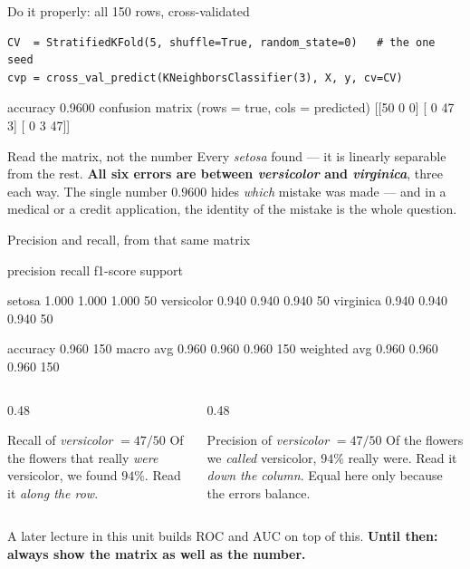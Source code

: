 \documentclass[aspectratio=169]{beamer}
\begin{document}
\begin{frame}[fragile,shrink=8]{Do it properly: all 150 rows, cross-validated}
\begin{lstlisting}
CV  = StratifiedKFold(5, shuffle=True, random_state=0)   # the one seed
cvp = cross_val_predict(KNeighborsClassifier(3), X, y, cv=CV)
\end{lstlisting}
\begin{outblk}
accuracy 0.9600
confusion matrix (rows = true, cols = predicted)
[[50  0  0]
 [ 0 47  3]
 [ 0  3 47]]
\end{outblk}
\begin{alertblock}{Read the matrix, not the number}
  \footnotesize Every \emph{setosa} found --- it is linearly separable from
  the rest. \textbf{All six errors are between \emph{versicolor} and
  \emph{virginica}}, three each way. The single number $0.9600$ hides
  \emph{which} mistake was made --- and in a medical or a credit application,
  the identity of the mistake is the whole question.
\end{alertblock}
\end{frame}

\begin{frame}[fragile,shrink=8]{Precision and recall, from that same matrix}
\begin{outblk}
              precision    recall  f1-score   support

      setosa      1.000     1.000     1.000        50
  versicolor      0.940     0.940     0.940        50
   virginica      0.940     0.940     0.940        50

    accuracy                          0.960       150
   macro avg      0.960     0.960     0.960       150
weighted avg      0.960     0.960     0.960       150
\end{outblk}
\begin{columns}[T]
  \begin{column}{0.48\textwidth}
    \begin{block}{Recall of \emph{versicolor} $= 47/50$}
      \small Of the flowers that really \emph{were} versicolor, we found
      $94\%$. Read it \emph{along the row}.
    \end{block}
  \end{column}
  \begin{column}{0.48\textwidth}
    \begin{block}{Precision of \emph{versicolor} $= 47/50$}
      \small Of the flowers we \emph{called} versicolor, $94\%$ really were.
      Read it \emph{down the column}. Equal here only because the errors
      balance.
    \end{block}
  \end{column}
\end{columns}
\begin{center}\small
  A later lecture in this unit builds ROC and AUC on top of this.
  \textbf{Until then: always show the matrix as well as the number.}
\end{center}
\end{frame}
\end{document}
